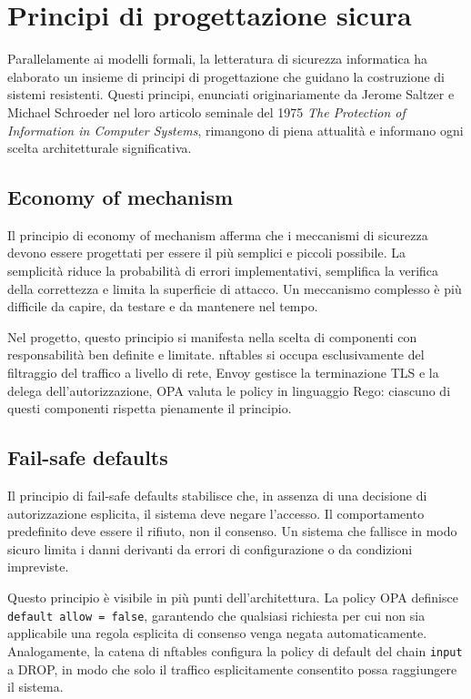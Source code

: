 \section{Principi di progettazione sicura}

Parallelamente ai modelli formali, la letteratura di sicurezza informatica ha elaborato un insieme di principi di progettazione che guidano la costruzione di sistemi resistenti. Questi principi, enunciati originariamente da Jerome Saltzer e Michael Schroeder nel loro articolo seminale del 1975 \textit{The Protection of Information in Computer Systems}, rimangono di piena attualità e informano ogni scelta architetturale significativa.

\subsection{Economy of mechanism}

Il principio di economy of mechanism afferma che i meccanismi di sicurezza devono essere progettati per essere il più semplici e piccoli possibile. La semplicità riduce la probabilità di errori implementativi, semplifica la verifica della correttezza e limita la superficie di attacco. Un meccanismo complesso è più difficile da capire, da testare e da mantenere nel tempo.

Nel progetto, questo principio si manifesta nella scelta di componenti con responsabilità ben definite e limitate. nftables si occupa esclusivamente del filtraggio del traffico a livello di rete, Envoy gestisce la terminazione TLS e la delega dell'autorizzazione, OPA valuta le policy in linguaggio Rego: ciascuno di questi componenti rispetta pienamente il principio.

\subsection{Fail-safe defaults}

Il principio di fail-safe defaults stabilisce che, in assenza di una decisione di autorizzazione esplicita, il sistema deve negare l'accesso. Il comportamento predefinito deve essere il rifiuto, non il consenso. Un sistema che fallisce in modo sicuro limita i danni derivanti da errori di configurazione o da condizioni impreviste.

Questo principio è visibile in più punti dell'architettura. La policy OPA definisce \texttt{default allow = false}, garantendo che qualsiasi richiesta per cui non sia applicabile una regola esplicita di consenso venga negata automaticamente. Analogamente, la catena di nftables configura la policy di default del chain \texttt{input} a DROP, in modo che solo il traffico esplicitamente consentito possa raggiungere il sistema.

